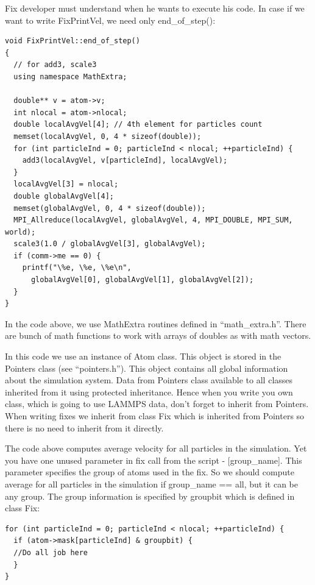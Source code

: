 \documentclass{article}
\begin{document}
Fix developer must understand when he wants to execute his code.  In
case if we want to write FixPrintVel, we need only end\_of\_step():

\begin{center}
\begin{verbatim}
void FixPrintVel::end_of_step()
{
  // for add3, scale3
  using namespace MathExtra;

  double** v = atom->v;
  int nlocal = atom->nlocal;
  double localAvgVel[4]; // 4th element for particles count
  memset(localAvgVel, 0, 4 * sizeof(double));
  for (int particleInd = 0; particleInd < nlocal; ++particleInd) {
    add3(localAvgVel, v[particleInd], localAvgVel);
  }
  localAvgVel[3] = nlocal;
  double globalAvgVel[4];
  memset(globalAvgVel, 0, 4 * sizeof(double));
  MPI_Allreduce(localAvgVel, globalAvgVel, 4, MPI_DOUBLE, MPI_SUM, world);
  scale3(1.0 / globalAvgVel[3], globalAvgVel);
  if (comm->me == 0) {
    printf("\%e, \%e, \%e\n",
      globalAvgVel[0], globalAvgVel[1], globalAvgVel[2]);
  }
}
\end{verbatim}
\end{center}

In the code above, we use MathExtra routines defined in
``math\_extra.h''.  There are bunch of math functions to work with
arrays of doubles as with math vectors.

In this code we use an instance of Atom class. This object is stored
in the Pointers class (see ``pointers.h''). This object contains all
global information about the simulation system. Data from Pointers
class available to all classes inherited from it using protected
inheritance. Hence when you write you own class, which is going to use
LAMMPS data, don't forget to inherit from Pointers.  When writing
fixes we inherit from class Fix which is inherited from Pointers so
there is no need to inherit from it directly.

The code above computes average velocity for all particles in the
simulation.  Yet you have one unused parameter in fix call from the
script - [group\_name].  This parameter specifies the group of atoms
used in the fix. So we should compute average for all particles in the
simulation if group\_name == all, but it can be any group. The group
information is specified by groupbit which is defined in class Fix:

\begin{center}
\begin{verbatim}
for (int particleInd = 0; particleInd < nlocal; ++particleInd) {
  if (atom->mask[particleInd] & groupbit) {
  //Do all job here
  }
}
\end{verbatim}
\end{center}
\end{document}
